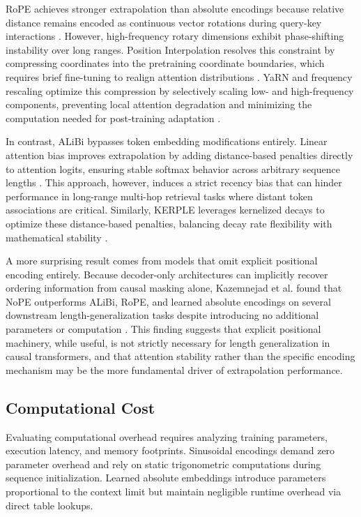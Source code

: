 \documentclass[conference]{IEEEtran}
\begin{document}
RoPE achieves stronger extrapolation than absolute encodings because relative distance remains encoded as continuous vector rotations during query-key interactions \cite{su2024roformer}. However, high-frequency rotary dimensions exhibit phase-shifting instability over long ranges. Position Interpolation resolves this constraint by compressing coordinates into the pretraining coordinate boundaries, which requires brief fine-tuning to realign attention distributions \cite{chen2023}. YaRN and frequency rescaling optimize this compression by selectively scaling low- and high-frequency components, preventing local attention degradation and minimizing the computation needed for post-training adaptation \cite{peng2023yarn,liu2024scaling}.

In contrast, ALiBi bypasses token embedding modifications entirely. Linear attention bias improves extrapolation by adding distance-based penalties directly to attention logits, ensuring stable softmax behavior across arbitrary sequence lengths \cite{press2022}. This approach, however, induces a strict recency bias that can hinder performance in long-range multi-hop retrieval tasks where distant token associations are critical. Similarly, KERPLE leverages kernelized decays to optimize these distance-based penalties, balancing decay rate flexibility with mathematical stability \cite{chi2022}.

A more surprising result comes from models that omit explicit positional encoding entirely. Because decoder-only architectures can implicitly recover ordering information from causal masking alone, Kazemnejad et al. found that NoPE outperforms ALiBi, RoPE, and learned absolute encodings on several downstream length-generalization tasks despite introducing no additional parameters or computation \cite{kazemnejad2023}. This finding suggests that explicit positional machinery, while useful, is not strictly necessary for length generalization in causal transformers, and that attention stability rather than the specific encoding mechanism may be the more fundamental driver of extrapolation performance.

\subsection{Computational Cost}

Evaluating computational overhead requires analyzing training parameters, execution latency, and memory footprints. Sinusoidal encodings demand zero parameter overhead and rely on static trigonometric computations during sequence initialization. Learned absolute embeddings introduce parameters proportional to the context limit but maintain negligible runtime overhead via direct table lookups.
\end{document}
